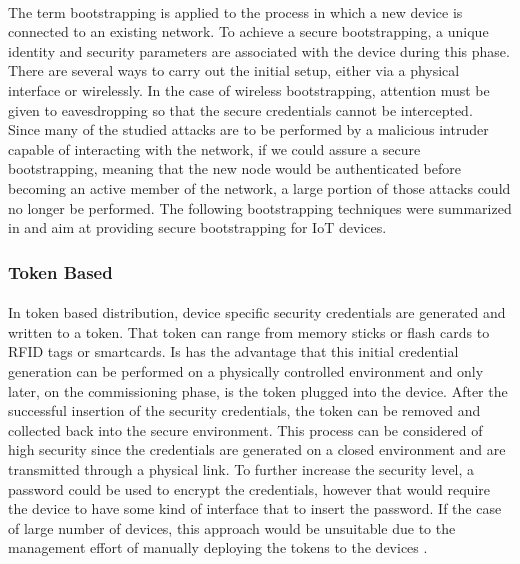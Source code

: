 \paragraph{}
The term bootstrapping is applied to the process in which a new device is connected to an existing network. To achieve a secure bootstrapping, a unique identity and security parameters are associated with the device during this phase. There are several ways to carry out the initial setup, either via a physical interface or wirelessly. In the case of wireless bootstrapping, attention must be given to eavesdropping so that the secure credentials cannot be intercepted.\\
Since many of the studied attacks are to be performed by a malicious intruder capable of interacting with the network, if we could assure a secure bootstrapping, meaning that the new node would be authenticated before becoming an active member of the network, a large portion of those attacks could no longer be performed. The following bootstrapping techniques were summarized in \cite{Fischer2012} and aim at providing secure bootstrapping for \ac{IoT} devices.

\subsubsection{Token Based}
\paragraph{}
In token based distribution, device specific security credentials are generated and written to a token. That token can range from memory sticks or flash cards to \ac{RFID} tags or smartcards. Is has the advantage that this initial credential generation can be performed on a physically controlled environment and only later, on the commissioning phase, is the token plugged into the device. After the successful insertion of the security credentials, the token can be removed and collected back into the secure environment. This process can be considered of high security since the credentials are generated on a closed environment and are transmitted through a physical link. To further increase the security level, a password could be used to encrypt the credentials, however that would require the device to have some kind of interface that to insert the password. If the case of large number of devices, this approach would be unsuitable due to the management effort of manually deploying the tokens to the devices \cite{Fischer2012}.

